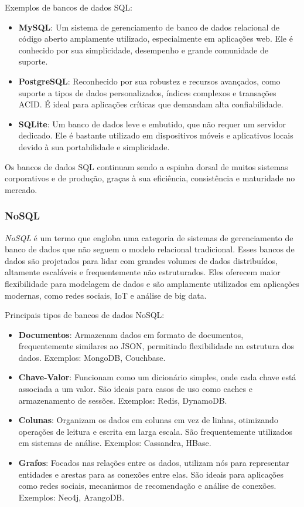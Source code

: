 Exemplos de bancos de dados SQL:

\begin{itemize}
    \item \textbf{MySQL}: Um sistema de gerenciamento de banco de dados relacional de código aberto amplamente utilizado, especialmente em aplicações web. Ele é conhecido por sua simplicidade, desempenho e grande comunidade de suporte.
    \item \textbf{PostgreSQL}: Reconhecido por sua robustez e recursos avançados, como suporte a tipos de dados personalizados, índices complexos e transações ACID. É ideal para aplicações críticas que demandam alta confiabilidade.
    \item \textbf{SQLite}: Um banco de dados leve e embutido, que não requer um servidor dedicado. Ele é bastante utilizado em dispositivos móveis e aplicativos locais devido à sua portabilidade e simplicidade.
\end{itemize}

Os bancos de dados SQL continuam sendo a espinha dorsal de muitos sistemas corporativos e de produção, graças à sua eficiência, consistência e maturidade no mercado.

\subsubsection{NoSQL}


\emph{NoSQL} é um termo que engloba uma categoria de sistemas de gerenciamento de banco de dados que não seguem o modelo relacional tradicional\cite{nosql-vs-sql}. Esses bancos de dados são projetados para lidar com grandes volumes de dados distribuídos, altamente escaláveis e frequentemente não estruturados. Eles oferecem maior flexibilidade para modelagem de dados e são amplamente utilizados em aplicações modernas, como redes sociais, IoT e análise de big data.

Principais tipos de bancos de dados NoSQL:

\begin{itemize}
    \item \textbf{Documentos}: Armazenam dados em formato de documentos, frequentemente similares ao JSON, permitindo flexibilidade na estrutura dos dados. Exemplos: MongoDB, Couchbase.
    \item \textbf{Chave-Valor}: Funcionam como um dicionário simples, onde cada chave está associada a um valor. São ideais para casos de uso como caches e armazenamento de sessões. Exemplos: Redis, DynamoDB.
    \item \textbf{Colunas}: Organizam os dados em colunas em vez de linhas, otimizando operações de leitura e escrita em larga escala. São frequentemente utilizados em sistemas de análise. Exemplos: Cassandra, HBase.
    \item \textbf{Grafos}: Focados nas relações entre os dados, utilizam nós para representar entidades e arestas para as conexões entre elas. São ideais para aplicações como redes sociais, mecanismos de recomendação e análise de conexões. Exemplos: Neo4j, ArangoDB.
\end{itemize}


